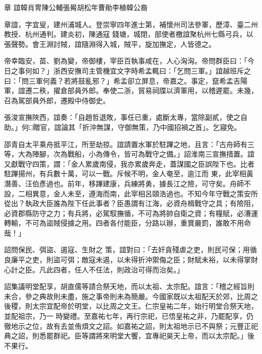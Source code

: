 
\begin{pinyinscope}

 章
 誼韓肖冑陳公輔張觷胡松年曹勛李稙韓公裔



 章誼，字宜叟，建州浦城人。登崇寧四年進士第，補懷州司法參軍，歷漳、臺二州教授、杭州通判。建炎初，陳通寇
 錢塘，城閉，部使者檄誼聚杭州七縣弓兵，以張聲勢。會王淵討賊，誼隨淵得入城，賊平，旋加撫定，人皆德之。



 帝幸臨安，苗、劉為變，帝御樓，宰臣百執事咸在，人心洶洶。帝問群臣曰：「今日之事何如？」浙西安撫司主管機宜文字時希孟輒曰：「乞問三軍。」誼越班斥之曰：「問三軍何義？若將鼓亂邪？」希孟卻立屏息，帝嘉之。事定，竄希孟吉陽軍，誼遷二秩，擢倉部員外郎。奉使二浙，貿易祠牒以濟軍用，以稽遲罷。未幾，召為駕部員外郎，遷殿中侍御史。



 張浚宣撫陜西，誼奏：「自趙哲退敗，事任已重，處斷太專，當除副貳，使之自助。」何□贈官，誼論其「折沖無謀，守御無策，乃中國招禍之首」。乞寢免。



 邵青自太平乘舟抵平江，所至劫掠。誼請置水軍於駐蹕之地，且言：「古舟師有三等，大為陣腳，次為戰船，小為傳令，皆可為戰守之備。」詔淮南三宣撫措置。誼又獻戰守四策，謂：「金人累歲南侵，我亦累歲奔走，蓋謀國之臣誤陛下也。比者駐蹕揚州，有兵數十萬，可以一戰。斥候不明，金人奄至，逾江而
 東，此宰相黃潛善、汪伯彥過也。前年，移蹕建康，兵練將勇，據長江之險，可守矣。舟師不設，二相異意，金人未至，遵海而南，此宰相呂頤浩過也。不知今年守戰之策安所從出？執政大臣誰為陛下任此事者？臣愚謂有江海，必資舟楫戰守之具；有險阻，必資郡縣防守之力；有兵將，必駕馭撫循，不可為將帥自衛之資；有糧賦，必漕運轉輸，不可為盜賊侵據之用。四者各付能臣，分路以辦，重賞嚴罰，誰敢不用命哉！」



 詔問保民、弭盜、遏寇、生財之
 策，誼對曰：「去奸貪殘虐之吏，則民可保；用循良廉平之吏，則盜可弭；敵寇未遏，以未得折沖禦侮之臣；財賦未裕，以未得掌財心計之臣。凡此四者，任人不任法，則政治可得而治矣。」



 詔集議明堂配享，胡直儒等請合祭天地，而以太祖、太宗配。誼言：「稽之經旨則未合，參之典故則未盡，施之事帝則未為簡嚴。今國家既以太祖配天於郊，比周之後稷，則太宗宜配帝於明堂，以比周之文王。仁宗皇祐二年，始行明堂合祭天地，並配祖宗，乃一
 時變禮。至嘉祐七年，再行宗祀，已悟皇祐之非，乃罷配享，仍徹地示之位，故有去並侑煩文之詔。如嘉祐之詔，則太祖地示已不與祭；元豐正祀典之詔，則悉罷群祀。臣等謂將來明堂大饗，宜專祀昊天上帝，而以太宗配。」後不果行。




\end{pinyinscope}
